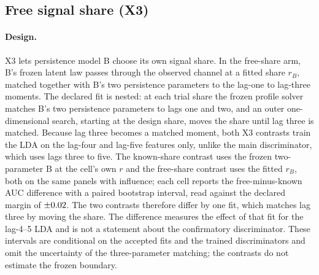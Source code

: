 
\subsection{Free signal share (X3)}\label{sec:x3}\label{supp:x3-x7}

\paragraph{Design.}
X3 lets persistence model B choose its own signal share. In the free-share arm, B's frozen latent law passes through the observed channel at a fitted share $r_B$, matched together with B's two persistence parameters to the lag-one to lag-three moments. The declared fit is nested: at each trial share the frozen profile solver matches B's two persistence parameters to lags one and two, and an outer one-dimensional search, starting at the design share, moves the share until lag three is matched. Because lag three becomes a matched moment, both X3 contrasts train the LDA on the lag-four and lag-five features only, unlike the main discriminator, which uses lags three to five. The known-share contrast uses the frozen two-parameter B at the cell's own $r$ and the free-share contrast uses the fitted $r_B$, both on the same panels with influence; each cell reports the free-minus-known AUC difference with a paired bootstrap interval, read against the declared margin of $\pm\resultnum{v4x.x3.summary.margin}{0.02}$. The two contrasts therefore differ by one fit, which matches lag three by moving the share. The difference measures the effect of that fit for the lag-4--5 LDA and is not a statement about the confirmatory discriminator.
These intervals are conditional on the accepted fits and the trained discriminators and omit the uncertainty of the three-parameter matching; the contrasts do not estimate the frozen boundary.

